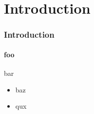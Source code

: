 \section{Introduction}
\begin{frame}
  \frametitle{Introduction}
  \framesubtitle{foo}
  bar
        \begin{itemize}
            \item baz
                \pause
              \item qux
        \end{itemize}
\end{frame}

